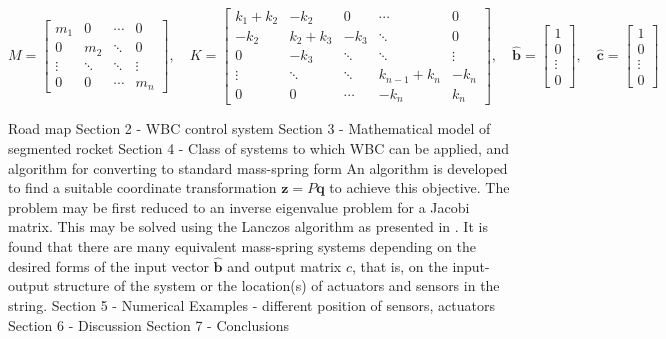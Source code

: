 \documentclass{mbd_fullpaper}
\begin{document}
\begin{equation}
M = \begin{bmatrix}
m_1  &  0 & \cdots & 0 \\
0 & m_2  & \ddots & 0 \\
\vdots & \ddots & \ddots & \vdots \\
0 & 0 & \cdots & m_n \end{bmatrix}
, \quad
K = \begin{bmatrix}
k_1+k_2  &  -k_2 & 0 & \cdots & 0 \\
-k_2 & k_2+k_3  & -k_3 & \ddots & 0 \\
0 & -k_3 & \ddots & \ddots & \vdots \\
\vdots & \ddots & \ddots & k_{n-1}+k_n & -k_{n} \\
0 & 0 & \cdots & -k_{n} & k_n \end{bmatrix}
,\quad \mathbf{\hat{b}} = \begin{bmatrix} 1 \\ 0 \\ \vdots \\ 0 \end{bmatrix}
,\quad \mathbf{\hat{c}} = \begin{bmatrix} 1 \\ 0 \\ \vdots \\ 0 \end{bmatrix}
\label{eq:ms3}
\end{equation}

Road map
Section 2 - WBC control system
Section 3 - Mathematical model of segmented rocket
Section 4 - Class of systems to which WBC can be applied, and algorithm for converting to standard mass-spring form
An algorithm is developed to find a suitable coordinate transformation $\mathbf{z} = P \mathbf{q}$ to achieve this objective.
The problem may be first reduced to an inverse eigenvalue problem for a Jacobi matrix. This may be solved using the Lanczos algorithm as presented in \cite{gladwell1986inverse}. 
It is found that there are many equivalent mass-spring systems depending on the desired forms of the input vector $\hat{\mathbf{b}}$ and output matrix $c$, that is, on the input-output structure of the system or the location(s) of actuators and sensors in the string.
Section 5 - Numerical Examples - different position of sensors, actuators
Section 6 - Discussion
Section 7 - Conclusions 
\end{document}
